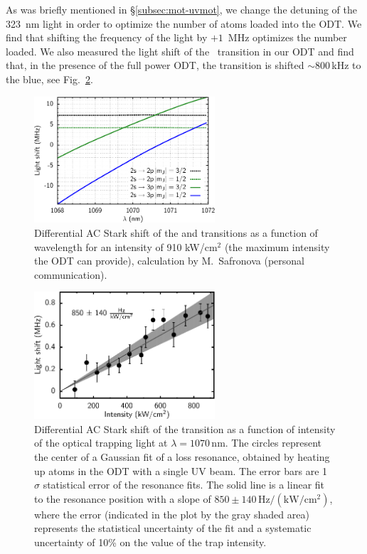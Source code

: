As was briefly mentioned in \S\ref{subsec:mot-uvmot}, we change the detuning of
the 323~nm light in order to optimize the number of atoms loaded into the ODT.
We find that shifting the frequency of the light by $+1$~MHz optimizes
the number loaded.   We also measured the light shift of the \uv\ transition in
our ODT and find that, in the presence of the full power ODT,  the transition
is shifted $\sim 800\,$kHz to the blue,  see Fig.~\ref{fig:lightshift-meas}. 
\begin{figure}
\centering
\includegraphics[width=0.6\textwidth]{../masters-figures/safronova/diffpoleps.pdf}
\caption[Differential AC Stark shift for 1070 nm light]{\small Differential AC
Stark shift of the \red and \uv transitions as a function of wavelength for an
intensity of 910 kW/cm$^{2}$ (the maximum intensity the ODT can provide),
calculation by M.~Safronova (personal communication).   }
\label{fig:lightshift-calc} 
\end{figure}
\begin{figure}
\centering
\includegraphics[width=0.6\textwidth]{../masters-figures/lightshift/lightshifteps.pdf}
\caption[Differential AC Stark shift for 1070 nm light]{\small Differential AC
Stark shift of the \uv transition as a function of intensity of the optical
trapping light at $\lambda=1070\,\mathrm{nm}$.  The circles represent the
center of a Gaussian fit of a loss resonance, obtained by heating up atoms in
the ODT with a single UV beam.  The error bars are 1 $\sigma$ statistical error
of the resonance fits.  The solid line is a linear fit to the resonance
position with a slope of $850\pm140 \,\mathrm{Hz/(kW/cm^{2})}$, where the error
(indicated in the plot by the gray shaded area) represents the statistical
uncertainty of the fit and a systematic uncertainty of 10\% on the value of the
trap intensity.  }
\label{fig:lightshift-meas} 
\end{figure}

